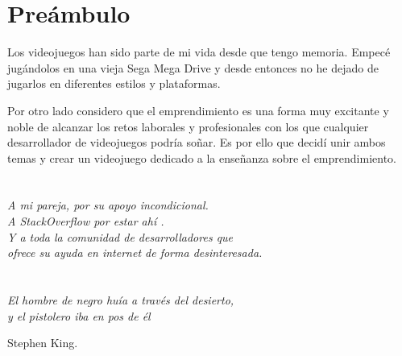 \chapter*{Preámbulo}
\thispagestyle{empty}
Los videojuegos han sido parte de mi vida desde que tengo memoria. Empecé jugándolos en una vieja Sega Mega Drive y desde entonces no he dejado de jugarlos en diferentes estilos y plataformas. 

Por otro lado considero que el emprendimiento es una forma muy excitante y noble de alcanzar los retos laborales y profesionales con los que cualquier desarrollador de videojuegos podría soñar.
Es por ello que decidí unir ambos temas y crear un videojuego dedicado a la enseñanza sobre el emprendimiento.

\cleardoublepage %
\chapter*{}
\setlength{\leftmargin}{0.5\textwidth}
\setlength{\parsep}{0cm}
\addtolength{\topsep}{0.5cm}
\begin{flushright}
\small\em{
A mi pareja, por su apoyo incondicional. \\
A StackOverflow por estar ahí . \\
Y a toda la comunidad de desarrolladores que \\
ofrece su ayuda en internet de forma desinteresada.
}
\end{flushright}


\cleardoublepage %
\chapter*{}
\setlength{\leftmargin}{0.5\textwidth}
\setlength{\parsep}{0cm}
\addtolength{\topsep}{0.5cm}
\begin{flushright}
\small\em{
El hombre de negro huía a través del desierto,\\
y el pistolero iba en pos de él
}
\end{flushright}
\begin{flushright}
\small{
Stephen King.
}
\end{flushright}
\cleardoublepage %
